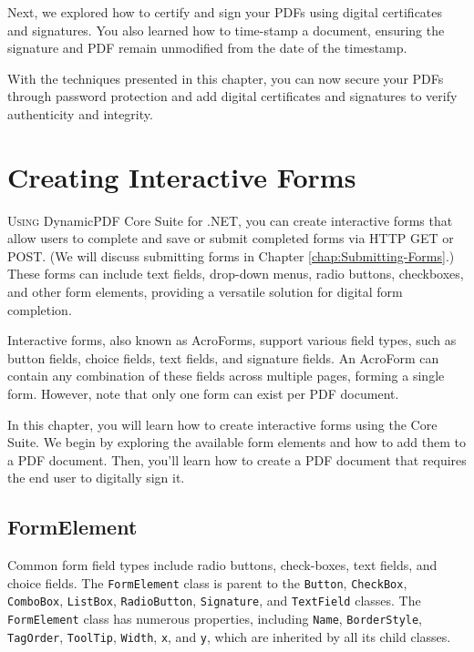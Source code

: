 \documentclass[american]{tufte-book}
\numberwithin{equation}{section}
\numberwithin{figure}{section}
\def\color#1{}%
\begin{document}
{Next, we explored how to certify and sign your PDFs using digital certificates and signatures. You also learned how to time-stamp a document, ensuring the signature and PDF remain unmodified from the date of the timestamp.

With the techniques presented in this chapter, you can now secure your PDFs through password protection and add digital certificates and signatures to verify authenticity and integrity.
\color{white}
\chapter{Creating Interactive Forms}\label{chap:Interactive-Forms}
\color{black}
\BgThispage
\vspace{8.0em}
\lettrine[lines=2,lhang=0.1]{U}{sing} DynamicPDF Core Suite for .NET, you can create interactive forms that allow users to complete and save or submit completed forms via HTTP GET or POST. (We will discuss submitting forms in Chapter \ref{chap:Submitting-Forms}.) These forms can include text fields, drop-down menus, radio buttons, checkboxes, and other form elements, providing a versatile solution for digital form completion.

Interactive forms, also known as AcroForms, support various field types, such as button fields, choice fields, text fields, and signature fields. An AcroForm can contain any combination of these fields across multiple pages, forming a single form. However, note that only one form can exist per PDF document.


In this chapter, you will learn how to create interactive forms using the Core Suite. We begin by exploring the available form elements and how to add them to a PDF document. Then, you'll learn how to create a PDF document that requires the end user to digitally sign it.
\section{FormElement}

Common form field types include radio buttons, check-boxes, text fields,
and choice fields. The \texttt{FormElement} class is parent to the
\texttt{Button}, \texttt{CheckBox}, \texttt{ComboBox}, \texttt{ListBox},
\texttt{RadioButton}, \texttt{Signature}, and \texttt{TextField} classes.
The \texttt{FormElement} class has numerous properties, including
\texttt{Name}, \texttt{BorderStyle}, \texttt{TagOrder}, \texttt{ToolTip},
\texttt{Width}, \texttt{x}, and \texttt{y}, which are inherited by
all its child classes. 

}
\end{document}

